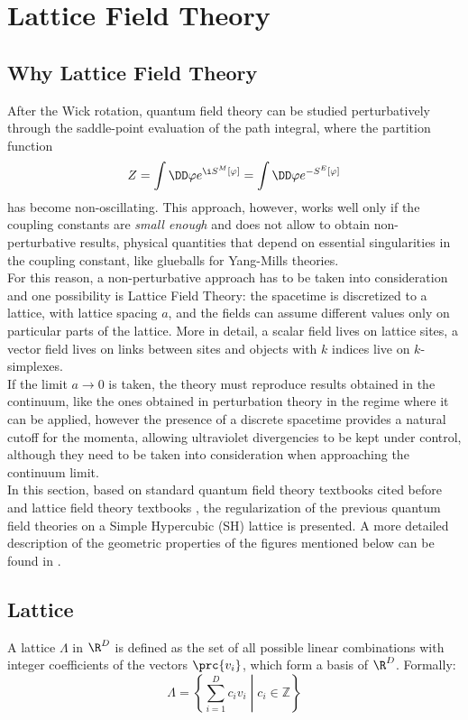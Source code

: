 \section{Lattice Field Theory}
\subsection{Why Lattice Field Theory}
After the Wick rotation, quantum field theory can be studied perturbatively through the saddle-point evaluation of the path integral, where the partition function
\begin{equation*}
    Z = \int\DD\varphi e^{\i S^M[\varphi]} = \int\DD\varphi e^{-S^E[\varphi]}
\end{equation*}
has become non-oscillating.
This approach, however, works well only if the coupling constants are \emph{small enough} and does not allow to obtain non-perturbative results, \ie physical quantities that depend on essential singularities in the coupling constant, like glueballs for Yang-Mills theories.\\
For this reason, a non-perturbative approach has to be taken into consideration and one possibility is Lattice Field Theory: the spacetime is discretized to a lattice, with lattice spacing $a$, and the fields can assume different values only on particular parts of the lattice.
More in detail, a scalar field lives on lattice sites, a vector field lives on links between sites and objects with $k$ indices live on $k$-simplexes.\\
If the limit $a\to0$ is taken, the theory must reproduce results obtained in the continuum, like the ones obtained in perturbation theory in the regime where it can be applied, however the presence of a discrete spacetime provides a natural cutoff for the momenta, allowing ultraviolet divergencies to be kept under control, although they need to be taken into consideration when approaching the continuum limit.\\
In this section, based on standard quantum field theory textbooks cited before and lattice field theory textbooks \cite{Montvay:1994cy, Gattringer:2010zz, DeGrand:2006zz}, the regularization of the previous quantum field theories on a Simple Hypercubic (SH) lattice is presented.
A more detailed description of the geometric properties of the figures mentioned below can be found in \cite{coxeter2012regular}.
\subsection{Lattice}
A lattice $\Lambda$ in $\R^D$ is defined as the set of all possible linear combinations with integer coefficients of the vectors $\prc{v_i}$, which form a basis of $\R^D$.
Formally:
\begin{equation}
    \Lambda =\left\{\left.\sum _{i=1}^{D}c_{i}v_{i}\;\right\vert \;c_{i}\in \mathbb {Z} \right\} \label{1:genericLattice}
\end{equation}


